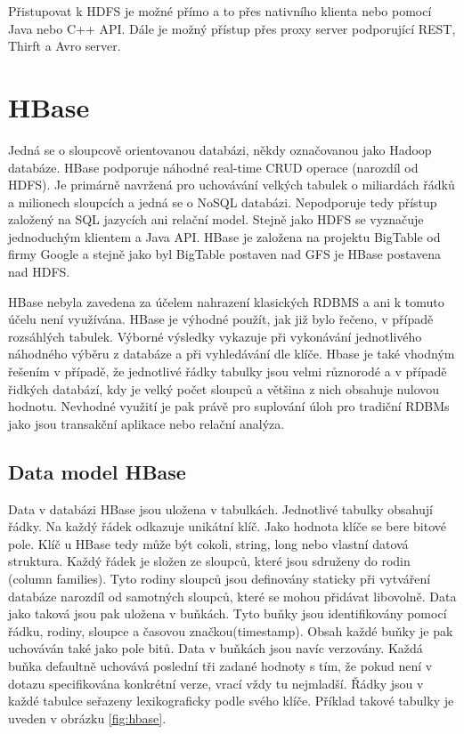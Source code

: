 \documentclass[thesis=M,czech]{FITthesis}[2012/06/26]
\begin{document}
Přistupovat k HDFS je možné přímo a to přes nativního klienta nebo pomocí Java nebo C++ API. Dále je možný přístup přes proxy server podporující REST, Thirft a Avro server.

\section{HBase}
Jedná se o sloupcově orientovanou databázi, někdy označovanou jako Hadoop databáze. HBase podporuje náhodné real-time CRUD operace (narozdíl od HDFS). Je primárně navržená pro uchovávání velkých tabulek o miliardách řádků a milionech sloupcích a jedná se o NoSQL databázi. Nepodporuje tedy přístup založený na SQL jazycích ani relační model. Stejně jako HDFS se vyznačuje jednoduchým klientem a Java API. HBase je založena na projektu BigTable od firmy Google\cite{BigTable} a stejně jako byl BigTable postaven nad GFS je HBase postavena nad HDFS.\cite{HbaseDG}

HBase nebyla zavedena za účelem nahrazení klasických RDBMS a ani k tomuto účelu není využívána. HBase je výhodné použít, jak již bylo řečeno, v případě rozsáhlých tabulek. Výborné výsledky vykazuje při vykonávání jednotlivého náhodného výběru z databáze a při vyhledávání dle klíče. Hbase je také vhodným řešením v případě, že jednotlivé řádky tabulky jsou velmi různorodé a v případě řidkých databází, kdy je velký počet sloupců a většina z nich obsahuje nulovou hodnotu. Nevhodné využití je pak právě pro suplování úloh pro tradiční RDBMs jako jsou transakční aplikace nebo relační analýza.\cite{HBaseWEB}

\subsection{Data model HBase}


Data v databázi HBase jsou uložena v tabulkách. Jednotlivé tabulky obsahují řádky. Na každý řádek odkazuje unikátní klíč. Jako hodnota klíče se bere bitové pole. Klíč u HBase tedy může být cokoli, string, long nebo vlastní datová struktura. Každý řádek je složen ze sloupců, které jsou sdruženy do rodin (column families). Tyto rodiny sloupců jsou definovány staticky při vytváření databáze narozdíl od samotných sloupců, které se mohou přidávat libovolně. Data jako taková jsou pak uložena v buňkách. Tyto buňky jsou identifikovány pomocí řádku, rodiny, sloupce a časovou značkou(timestamp). Obsah každé buňky je pak uchováván také jako pole bitů. Data v buňkách jsou navíc verzovány. Každá buňka defaultně uchovává poslední tři zadané hodnoty s tím, že pokud není v dotazu specifikována konkrétní verze, vrací vždy tu nejmladší. Řádky jsou v každé tabulce seřazeny lexikograficky podle svého klíče. Příklad takové tabulky je uveden v obrázku \ref{fig:hbase}.
\end{document}
